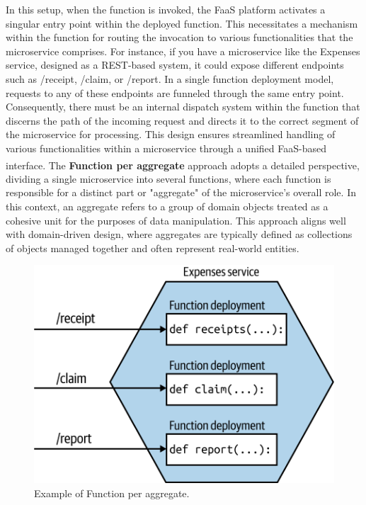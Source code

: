 In this setup, when the function is invoked, the FaaS platform activates a singular entry point
within the deployed function. This necessitates a mechanism within the function for routing the
invocation to various functionalities that the microservice comprises. For instance, if you have a
microservice like the Expenses service, designed as a REST-based system, it could expose different
endpoints such as /receipt, /claim, or /report. In a single function deployment model, requests to
any of these endpoints are funneled through the same entry point. Consequently, there must be an
internal dispatch system within the function that discerns the path of the incoming request and
directs it to the correct segment of the microservice for processing. This design ensures
streamlined handling of various functionalities within a microservice through a unified FaaS-based
interface\textsuperscript{\cite{microservices_book}}.
\newline
\newline
The \textbf{Function per aggregate} approach adopts a detailed perspective, dividing a single
microservice into several functions, where each function is responsible for a distinct part or
"aggregate" of the microservice's overall role. In this context, an aggregate refers to a group of
domain objects treated as a cohesive unit for the purposes of data manipulation. This approach
aligns well with domain-driven design, where aggregates are typically defined as collections of
objects managed together and often represent real-world entities.

\begin{figure}
    \centering
    \includegraphics[scale=1]{Pictures/3_multiple_functions.png}
    \caption{Example of Function per aggregate.}
    \label{fig:3_multiple_functions}
\end{figure}

